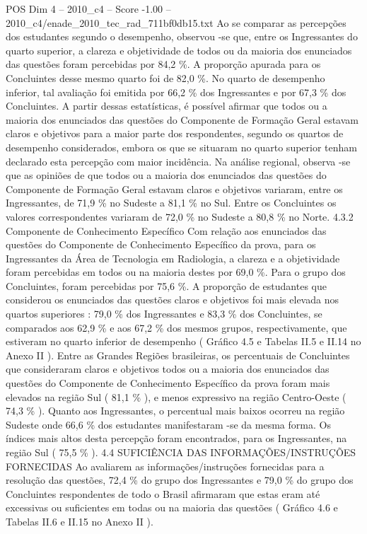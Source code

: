 \begin{textsample}{POS Dim 4 – 2010\_c4 – Score -1.00 – 2010\_c4/enade\_2010\_tec\_rad\_711bf0db15.txt}
Ao se comparar as percepções dos estudantes segundo o desempenho, observou -se que, entre os Ingressantes do quarto superior, a clareza e objetividade de todos ou da maioria dos enunciados das questões foram percebidas por 84,2 \%.
A proporção apurada para os Concluintes desse mesmo quarto foi de 82,0 \%.
No quarto de desempenho inferior, tal avaliação foi emitida por 66,2 \% dos Ingressantes e por 67,3 \% dos Concluintes.
A partir dessas estatísticas, é possível afirmar que todos ou a maioria dos enunciados das questões do Componente de Formação Geral estavam claros e objetivos para a maior parte dos respondentes, segundo os quartos de desempenho considerados, embora os que se situaram no quarto superior tenham declarado esta percepção com maior incidência.
Na análise regional, observa -se que as opiniões de que todos ou a maioria dos enunciados das questões do Componente de Formação Geral estavam claros e objetivos variaram, entre os Ingressantes, de 71,9 \% no Sudeste a 81,1 \% no Sul.
Entre os Concluintes os valores correspondentes variaram de 72,0 \% no Sudeste a 80,8 \% no Norte. 4.3.2 Componente de Conhecimento Específico Com relação aos enunciados das questões do Componente de Conhecimento Específico da prova, para os Ingressantes da Área de Tecnologia em Radiologia, a clareza e a objetividade foram percebidas em todos ou na maioria destes por 69,0 \%.
Para o grupo dos Concluintes, foram percebidas por 75,6 \%.
A proporção de estudantes que considerou os enunciados das questões claros e objetivos foi mais elevada nos quartos superiores : 79,0 \% dos Ingressantes e 83,3 \% dos Concluintes, se comparados aos 62,9 \% e aos 67,2 \% dos mesmos grupos, respectivamente, que estiveram no quarto inferior de desempenho ( Gráfico 4.5 e Tabelas II.5 e II.14 no Anexo II ).
Entre as Grandes Regiões brasileiras, os percentuais de Concluintes que consideraram claros e objetivos todos ou a maioria dos enunciados das questões do Componente de Conhecimento Específico da prova foram mais elevados na região Sul ( 81,1 \% ), e menos expressivo na região Centro-Oeste ( 74,3 \% ).
Quanto aos Ingressantes, o percentual mais baixos ocorreu na região Sudeste onde 66,6 \% dos estudantes manifestaram -se da mesma forma.
Os índices mais altos desta percepção foram encontrados, para os Ingressantes, na região Sul ( 75,5 \% ). 4.4 SUFICIÊNCIA DAS INFORMAÇÕES/INSTRUÇÕES FORNECIDAS Ao avaliarem as informações/instruções fornecidas para a resolução das questões, 72,4 \% do grupo dos Ingressantes e 79,0 \% do grupo dos Concluintes respondentes de todo o Brasil afirmaram que estas eram até excessivas ou suficientes em todas ou na maioria das questões ( Gráfico 4.6 e Tabelas II.6 e II.15 no Anexo II ).

\end{textsample}
